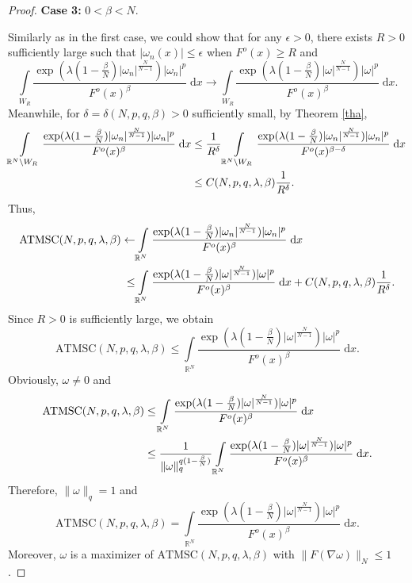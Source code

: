 \documentclass[10pt,a4paper]{amsart}
\newcommand{\R}{\mathbb{R}}
\begin{document}
\begin{proof}
{\bfseries Case 3:} $0<\beta<N$.

Similarly as in the first case, we could show that for any $\epsilon>0$, there exists $R>0$ sufficiently large such that $\lvert\omega_{n}(x)\rvert\leq\epsilon$ when $F^{o}(x)\geq R$ and
$$
\int\limits_{W_{R}}\frac{\exp(\lambda(1-\frac{\beta}{N})\lvert \omega_{n}\rvert^{\frac{N}{N-1}})\lvert \omega_{n}\rvert^{p}}{F^{o}(x)^{\beta}}\;\mathrm{d}x\rightarrow\int\limits_{W_{R}}\frac{\exp(\lambda(1-\frac{\beta}{N})\lvert \omega\rvert^{\frac{N}{N-1}})\lvert \omega\rvert^{p}}{F^{o}(x)^{\beta}}\;\mathrm{d}x.
$$
Meanwhile, for $\delta=\delta(N,p,q,\beta)>0$ sufficiently small, by Theorem \ref{tha},
\begin{align}
    \int\limits_{\R^{N}\backslash W_{R}}\frac{\exp(\lambda(1-\frac{\beta}{N})\lvert \omega_{n}\rvert^{\frac{N}{N-1}})\lvert \omega_{n}\rvert^{p}}{F^{o}(x)^{\beta}}\;\mathrm{d}x&\leq\frac{1}{R^{\delta}}\int\limits_{\R^{N}\backslash W_{R}}\frac{\exp(\lambda(1-\frac{\beta}{N})\lvert \omega_{n}\rvert^{\frac{N}{N-1}})\lvert \omega_{n}\rvert^{p}}{F^{o}(x)^{\beta-\delta}}\;\mathrm{d}x\notag\\
    &\leq C(N,p,q,\lambda,\beta)\frac{1}{R^{\delta}}.\notag
\end{align}
Thus,
\begin{align}
    \mathrm{ATMSC}(N,p,q,\lambda,\beta)\leftarrow&\int\limits_{\R^{N}}\frac{\exp(\lambda(1-\frac{\beta}{N})\lvert \omega_{n}\rvert^{\frac{N}{N-1}})\lvert \omega_{n}\rvert^{p}}{F^{o}(x)^{\beta}}\;\mathrm{d}x\notag\\
    \leq&\int\limits_{\R^{N}}\frac{\exp(\lambda(1-\frac{\beta}{N})\lvert \omega\rvert^{\frac{N}{N-1}})\lvert \omega\rvert^{p}}{F^{o}(x)^{\beta}}\;\mathrm{d}x+C(N,p,q,\lambda,\beta)\frac{1}{R^{\delta}}.\notag
\end{align}
Since $R>0$ is sufficiently large, we obtain
$$
\mathrm{ATMSC}(N,p,q,\lambda,\beta)\leq\int\limits_{\R^{N}}\frac{\exp(\lambda(1-\frac{\beta}{N})\lvert \omega\rvert^{\frac{N}{N-1}})\lvert \omega\rvert^{p}}{F^{o}(x)^{\beta}}\;\mathrm{d}x.
$$
Obviously, $\omega\not=0$ and
\begin{align}
    \mathrm{ATMSC}(N,p,q,\lambda,\beta)&\leq\int\limits_{\R^{N}}\frac{\exp(\lambda(1-\frac{\beta}{N})\lvert \omega\rvert^{\frac{N}{N-1}})\lvert \omega\rvert^{p}}{F^{o}(x)^{\beta}}\;\mathrm{d}x\notag\\
    &\leq\frac{1}{\|\omega\|_{q}^{q(1-\frac{\beta}{N})}}\int\limits_{\R^{N}}\frac{\exp(\lambda(1-\frac{\beta}{N})\lvert \omega\rvert^{\frac{N}{N-1}})\lvert \omega\rvert^{p}}{F^{o}(x)^{\beta}}\;\mathrm{d}x.\notag
\end{align}
Therefore, $\|\omega\|_{q}=1$ and
$$
\mathrm{ATMSC}(N,p,q,\lambda,\beta)=\int\limits_{\R^{N}}\frac{\exp(\lambda(1-\frac{\beta}{N})\lvert \omega\rvert^{\frac{N}{N-1}})\lvert \omega\rvert^{p}}{F^{o}(x)^{\beta}}\;\mathrm{d}x.
$$
Moreover, $\omega$ is a maximizer of $\mathrm{ATMSC}(N,p,q,\lambda,\beta)$ with $\|F(\nabla\omega)\|_{N}\leq1$.


\end{proof}
\end{document}
